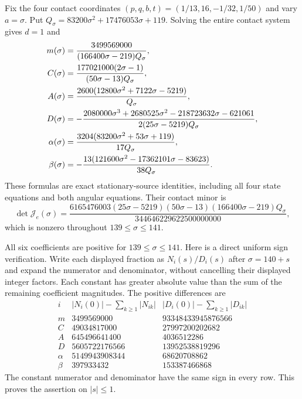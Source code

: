 \documentclass[11pt]{article}
\begin{document}
Fix the four contact coordinates
$(p,q,b,t)=(1/13,16,-1/32,1/50)$ and vary $a=\sigma$.
Put $Q_\sigma=83200\sigma^2+17476053\sigma+119$.  Solving the entire
contact system gives $d=1$ and
\begin{align}
 m(\sigma)&=\frac{3499569000}
 {(166400\sigma-219)Q_\sigma},\notag\\
 C(\sigma)&=\frac{177021000(2\sigma-1)}
 {(50\sigma-13)Q_\sigma},\notag\\
 A(\sigma)&=\frac{2600(12800\sigma^2+7122\sigma-5219)}{Q_\sigma},\notag\\
 D(\sigma)&=-\frac{2080000\sigma^3+2680525\sigma^2
                         -218723632\sigma-621061}
                    {2(25\sigma-5219)Q_\sigma},\notag\\
 \alpha(\sigma)&=\frac{3204(83200\sigma^2+53\sigma+119)}{17Q_\sigma},\notag\\
 \beta(\sigma)&=-\frac{13(121600\sigma^2-17362101\sigma-83623)}
                         {38Q_\sigma}.
 \label{eq:family}
\end{align}
These formulas are exact stationary-source identities, including all
four state equations and both angular equations.
Their contact minor is
\begin{equation}
 \det\mathcal J_e(\sigma)=
 \frac{6165476003(25\sigma-5219)(50\sigma-13)
                       (166400\sigma-219)Q_\sigma}
      {344646229622500000000},
 \label{eq:familyminor}
\end{equation}
which is nonzero throughout $139\leq\sigma\leq141$.

All six coefficients are positive for $139\leq\sigma\leq141$.
Here is a direct uniform sign verification.  Write each displayed
fraction as $N_i(s)/D_i(s)$ after $\sigma=140+s$ and expand the
numerator and denominator, without cancelling their displayed integer
factors.  Each constant has greater absolute value than the sum of
the remaining coefficient magnitudes.  The positive differences are
\[
\begin{array}{c|r|r}
 i& |N_i(0)|-\sum_{k\geq1}|N_{ik}|
    &|D_i(0)|-\sum_{k\geq1}|D_{ik}|\\\hline
 m&3499569000&93348433945876566\\
 C&49034817000&27997200202682\\
 A&645496641400&4036512286\\
 D&5605722176566&13952538819296\\
 \alpha&5149943908344&68620708862\\
 \beta&397933432&153387466868
\end{array}
\]
The constant numerator and denominator have the same sign in every row.
This proves the assertion on $|s|\leq1$.
\end{document}
